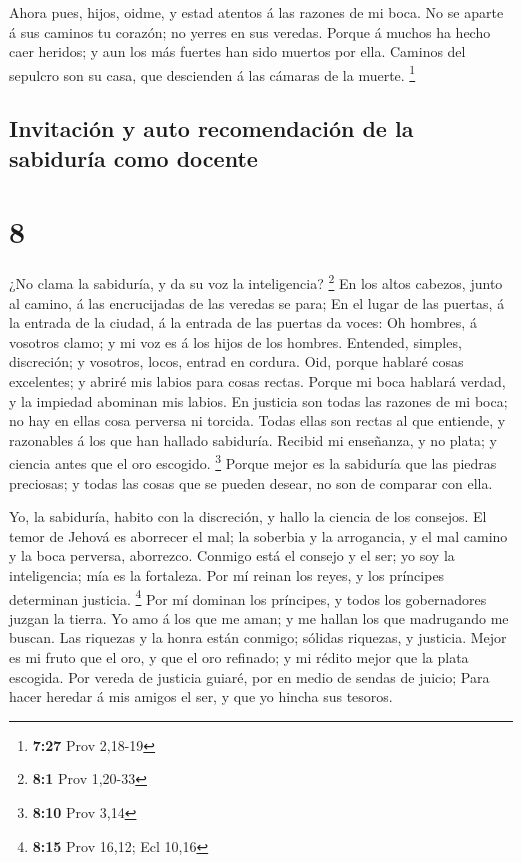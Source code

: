  Ahora pues, hijos, oidme, y estad atentos á las razones de
mi boca.  No se aparte á sus caminos tu corazón; no yerres
en sus veredas.  Porque á muchos ha hecho caer heridos; y
aun los más fuertes han sido muertos por ella.  Caminos del
sepulcro son su casa, que descienden á las cámaras de la muerte.
\footnote{\textbf{7:27} Prov 2,18-19}

\hypertarget{invitaciuxf3n-y-auto-recomendaciuxf3n-de-la-sabiduruxeda-como-docente}{%
\subsection{Invitación y auto recomendación de la sabiduría como
docente}\label{invitaciuxf3n-y-auto-recomendaciuxf3n-de-la-sabiduruxeda-como-docente}}

\hypertarget{section-7}{%
\section{8}\label{section-7}}

 ¿No clama la sabiduría, y da su voz la inteligencia?
\footnote{\textbf{8:1} Prov 1,20-33}  En los altos cabezos,
junto al camino, á las encrucijadas de las veredas se para; 
En el lugar de las puertas, á la entrada de la ciudad, á la entrada de
las puertas da voces:  Oh hombres, á vosotros clamo; y mi
voz es á los hijos de los hombres.  Entended, simples,
discreción; y vosotros, locos, entrad en cordura.  Oid,
porque hablaré cosas excelentes; y abriré mis labios para cosas rectas.
 Porque mi boca hablará verdad, y la impiedad abominan mis
labios.  En justicia son todas las razones de mi boca; no
hay en ellas cosa perversa ni torcida.  Todas ellas son
rectas al que entiende, y razonables á los que han hallado sabiduría.
 Recibid mi enseñanza, y no plata; y ciencia antes que el
oro escogido. \footnote{\textbf{8:10} Prov 3,14}  Porque
mejor es la sabiduría que las piedras preciosas; y todas las cosas que
se pueden desear, no son de comparar con ella.

 Yo, la sabiduría, habito con la discreción, y hallo la
ciencia de los consejos.  El temor de Jehová es aborrecer
el mal; la soberbia y la arrogancia, y el mal camino y la boca perversa,
aborrezco.  Conmigo está el consejo y el ser; yo soy la
inteligencia; mía es la fortaleza.  Por mí reinan los
reyes, y los príncipes determinan justicia. \footnote{\textbf{8:15} Prov
  16,12; Ecl 10,16}  Por mí dominan los príncipes, y todos
los gobernadores juzgan la tierra.  Yo amo á los que me
aman; y me hallan los que madrugando me buscan.  Las
riquezas y la honra están conmigo; sólidas riquezas, y justicia.
 Mejor es mi fruto que el oro, y que el oro refinado; y mi
rédito mejor que la plata escogida.  Por vereda de justicia
guiaré, por en medio de sendas de juicio;  Para hacer
heredar á mis amigos el ser, y que yo hincha sus tesoros.

